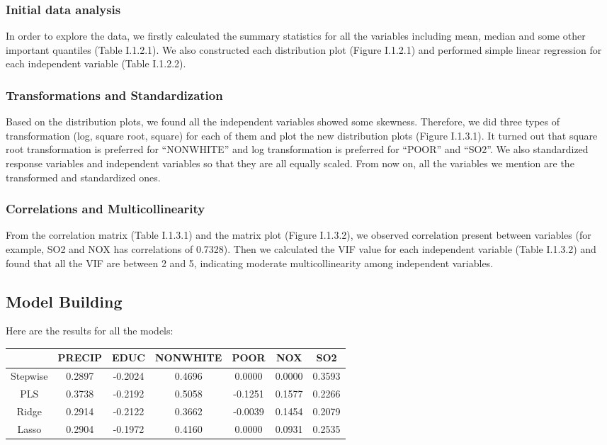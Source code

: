 \documentclass{article}
\begin{document}
    \subsubsection{Initial data analysis}
       In order to explore the data, we firstly calculated the summary statistics for all the variables including mean, median and some other important quantiles (Table I.1.2.1). We also constructed each distribution plot (Figure I.1.2.1) and performed simple linear regression for each independent variable (Table I.1.2.2).

    \subsubsection{Transformations and Standardization}
       Based on the distribution plots, we found all the independent variables showed some skewness. Therefore, we did three types of transformation (log, square root, square) for each of them and plot the new distribution plots (Figure I.1.3.1). It turned out that square root transformation is preferred for “NONWHITE” and log transformation is preferred for “POOR” and “SO2”. We also standardized response variables and independent variables so that they are all equally scaled. From now on, all the variables we mention are the transformed and standardized ones.

    \subsubsection{Correlations and Multicollinearity}
       From the correlation matrix (Table I.1.3.1) and the matrix plot (Figure I.1.3.2), we observed correlation present between variables (for example, SO2 and NOX has correlations of 0.7328). Then we calculated the VIF value for each independent variable (Table I.1.3.2) and found that all the VIF are between 2 and 5, indicating moderate multicollinearity among independent variables.

  \subsection{Model Building}

    Here are the results for all the models:

    \begin{center}
         \begin{tabular}{c c c c c c c}
           \hline
           & PRECIP & EDUC & NONWHITE & POOR & NOX & SO2\\
           \hline
           Stepwise & 0.2897 & -0.2024 & 0.4696 & 0.0000 & 0.0000 & 0.3593\\
           PLS      & 0.3738 & -0.2192 & 0.5058 & -0.1251 & 0.1577 & 0.2266\\
           Ridge    & 0.2914 & -0.2122 & 0.3662 & -0.0039 & 0.1454 & 0.2079\\
           Lasso    & 0.2904 & -0.1972 & 0.4160 & 0.0000 & 0.0931 & 0.2535\\
           \hline
         \end{tabular}
       \end{center}
\end{document}

